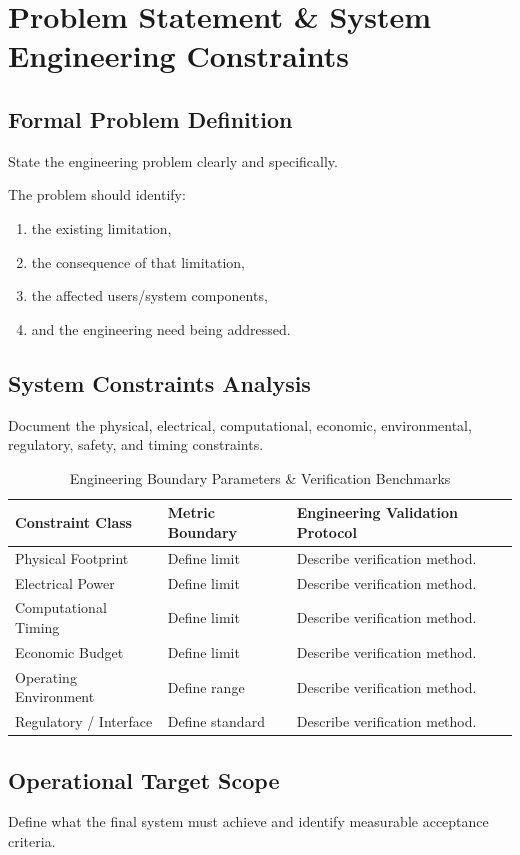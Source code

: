 
\section{Problem Statement \& System Engineering Constraints}

\subsection{Formal Problem Definition}

State the engineering problem clearly and specifically.

The problem should identify:
\begin{enumerate}
    \item the existing limitation,
    \item the consequence of that limitation,
    \item the affected users/system components,
    \item and the engineering need being addressed.
\end{enumerate}

\subsection{System Constraints Analysis}

Document the physical, electrical, computational, economic, environmental,
regulatory, safety, and timing constraints.

\begin{table}[!htbp]
    \centering
    \small
    \renewcommand{\arraystretch}{1.5}
    \begin{tabular}{p{3.5cm}p{3cm}p{8cm}}
        \toprule
        \textbf{Constraint Class} &
        \textbf{Metric Boundary} &
        \textbf{Engineering Validation Protocol} \\
        \midrule
        Physical Footprint & Define limit & Describe verification method. \\
        Electrical Power & Define limit & Describe verification method. \\
        Computational Timing & Define limit & Describe verification method. \\
        Economic Budget & Define limit & Describe verification method. \\
        Operating Environment & Define range & Describe verification method. \\
        Regulatory / Interface & Define standard & Describe verification method. \\
        \bottomrule
    \end{tabular}
    \caption{Engineering Boundary Parameters \& Verification Benchmarks}
\end{table}

\subsection{Operational Target Scope}

Define what the final system must achieve and identify measurable acceptance criteria.
